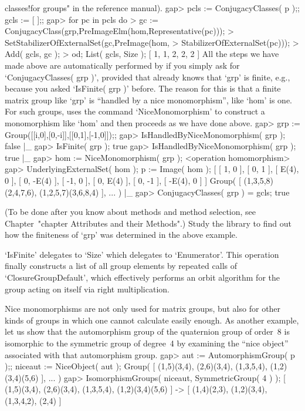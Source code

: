 classes!for groups" in the reference manual).
\beginexample
    gap> pcls := ConjugacyClasses( p );; gcls := [  ];;
    gap> for pc  in pcls  do
    >      gc := ConjugacyClass(grp,PreImageElm(hom,Representative(pc)));
    >      SetStabilizerOfExternalSet(gc,PreImage(hom,
    >                                 StabilizerOfExternalSet(pc)));
    >      Add( gcls, gc );
    >    od; List( gcls, Size );
    [ 1, 1, 2, 2, 2 ]
\endexample
All the steps we have made above are automatically performed by {\GAP} if
you  simply   ask for `ConjugacyClasses(  grp  )',   provided that {\GAP}
already knows that  `grp' is finite,  e.g., because you asked  `IsFinite(
grp )'  before. The reason  for this is that a   finite matrix group like
`grp' is ``handled by a nice monomorphism'',  like `hom' is one. For such
groups,  {\GAP} uses  the command   `NiceMonomorphism'   to construct   a
monomorphism like `hom' and then proceeds as we have done above.
\beginexample
    gap> grp := Group([[i,0],[0,-i]],[[0,1],[-1,0]]);;
    gap> IsHandledByNiceMonomorphism( grp );
    false
|_
    gap> IsFinite( grp );
    true
    gap> IsHandledByNiceMonomorphism( grp );
    true
|_
    gap> hom := NiceMonomorphism( grp );
    <operation homomorphism>
    gap> UnderlyingExternalSet( hom ); p := Image( hom );
    [ [ 1, 0 ], [ 0, 1 ], [ E(4), 0 ], [ 0, -E(4) ], [ -1, 0 ],
      [ 0, E(4) ], [ 0, -1 ], [ -E(4), 0 ] ]
    Group( [ (1,3,5,8)(2,4,7,6), (1,2,5,7)(3,6,8,4) ], ... )
|_
    gap> ConjugacyClasses( grp ) = gcls;
    true
\endexample

\exercise (To be done after you know about  methods and method selection,
see  Chapter~"chapter Attributes and their   Methods".) Study the  {\GAP}
library to find  out how the  finiteness of  `grp' was determined  in the
above example.

\answer `IsFinite' delegates to  `Size' which delegates  to `Enumerator'.
This  operation finally constructs    a list of  all  group   elements by
repeated calls of   `ClosureGroupDefault', which effectively performs  an
orbit algorithm for the group acting on itself via right multiplication.

Nice monomorphisms are  not  only used  for matrix groups,  but  also for
other kinds  of groups in  which one cannot   calculate easily enough. As
another  example,   let us   show that  the    automorphism group of  the
quaternion group  of  order~8 is isomorphic  to  the  symmetric  group of
degree~4   by examining    the  ``nice   object'' associated  with   that
automorphism group.
\beginexample
    gap> aut := AutomorphismGroup( p );; niceaut := NiceObject( aut );
    Group( [ (1,5)(3,4), (2,6)(3,4), (1,3,5,4), (1,2)(3,4)(5,6) ], ... )
    gap> IsomorphismGroups( niceaut, SymmetricGroup( 4 ) );
    [ (1,5)(3,4), (2,6)(3,4), (1,3,5,4), (1,2)(3,4)(5,6) ] -> 
    [ (1,4)(2,3), (1,2)(3,4), (1,3,4,2), (2,4) ]
\endexample

